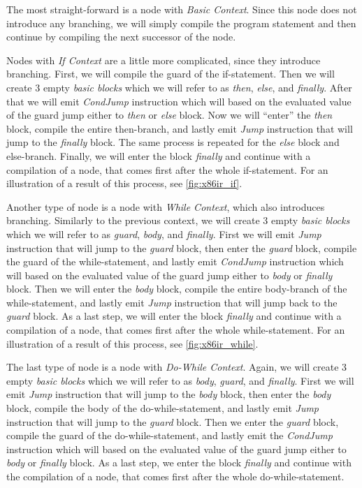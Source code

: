 \documentclass[thesis=M,english]{FITthesis}[2019/12/23]
\begin{document}
The most straight-forward is a node with \emph{Basic Context}. Since this node does not introduce any branching, we will simply compile the program statement and then continue by compiling the next successor of the node.

Nodes with \emph{If Context} are a little more complicated, since they introduce branching. First, we will compile the guard of the if-statement. Then we will create 3 empty \emph{basic blocks} which we will refer to as \emph{then}, \emph{else}, and \emph{finally}. After that we will emit \emph{CondJump} instruction which will based on the evaluated value of the guard jump either to \emph{then} or \emph{else} block. Now we will “enter” the \emph{then} block, compile the entire then-branch, and lastly emit \emph{Jump} instruction that will jump to the \emph{finally} block. The same process is repeated for the \emph{else} block and else-branch. Finally, we will enter the block \emph{finally} and continue with a compilation of a node, that comes first after the whole if-statement. For an illustration of a result of this process, see \autoref{fig:x86ir_if}.

Another type of node is a node with \emph{While Context}, which also introduces branching. Similarly to the previous context, we will create 3 empty \emph{basic blocks} which we will refer to as \emph{guard}, \emph{body}, and \emph{finally}. First we will emit \emph{Jump} instruction that will jump to the \emph{guard} block, then enter the \emph{guard} block, compile the guard of the while-statement, and lastly emit \emph{CondJump} instruction which will based on the evaluated value of the guard jump either to \emph{body} or \emph{finally} block. Then we will enter the \emph{body} block, compile the entire body-branch of the while-statement, and lastly emit \emph{Jump} instruction that will jump back to the \emph{guard} block. As a last step, we will enter the block \emph{finally} and continue with a compilation of a node, that comes first after the whole while-statement. For an illustration of a result of this process, see \autoref{fig:x86ir_while}.

The last type of node is a node with \emph{Do-While Context}. Again, we will create 3 empty \emph{basic blocks} which we will refer to as \emph{body}, \emph{guard}, and \emph{finally}. First we will emit \emph{Jump} instruction that will jump to the \emph{body} block, then enter the \emph{body} block, compile the body of the do-while-statement, and lastly emit \emph{Jump} instruction that will jump to the \emph{guard} block. Then we enter the \emph{guard} block, compile the guard of the do-while-statement, and lastly emit the \emph{CondJump} instruction which will based on the evaluated value of the guard jump either to \emph{body} or \emph{finally} block. As a last step, we enter the block \emph{finally} and continue with the compilation of a node, that comes first after the whole do-while-statement.
\end{document}
